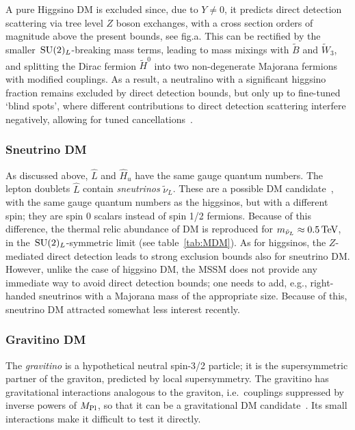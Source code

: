 A pure Higgsino DM \cite{Higgsino:DM} is excluded since, due to $Y \neq 0$, it predicts direct detection scattering via tree level $Z$ boson exchanges, 
with a  cross section orders of magnitude above the present bounds, see fig.a.
This can be rectified by the smaller $\,{\rm SU}(2)_L$-breaking mass terms, leading to mass mixings with $\tilde{B}$ and $\tilde{W}_3$,
and splitting the Dirac fermion $\tilde H^0$ into two non-degenerate Majorana fermions with modified couplings.
As a result, a neutralino with a significant higgsino fraction remains excluded 
by direct detection bounds, but only up to fine-tuned `blind spots',  where different contributions to direct detection scattering
interfere negatively, allowing for tuned cancellations~\cite{WellTempered}.


\subsubsection{Sneutrino DM}
As discussed above, $\hat L$ and $\hat H_u$ have the same gauge quantum numbers.
The lepton doublets $\hat L$ contain {\em sneutrinos} $\tilde{\nu}_L$. 
These are a possible DM candidate~\cite{Sneutrino:DM}, with the same gauge quantum numbers
as the higgsinos, but with a different spin; they are spin 0 scalars instead of spin 1/2 fermions. 
Because of this difference, the thermal relic abundance of DM is reproduced for
$ m_{\tilde{\nu}_L} \approx 0.5\,{\rm TeV}$, in the $\,{\rm SU}(2)_L$-symmetric limit (see table~\ref{tab:MDM}).
As for higgsinos, the $Z$-mediated direct detection leads to strong exclusion bounds also for sneutrino DM.
However, unlike the case of higgsino DM, the MSSM does not provide any immediate way to avoid direct detection bounds;
one needs to add, e.g., right-handed sneutrinos with a Majorana mass of the appropriate size.
Because of this, sneutrino DM attracted somewhat less interest recently.





\subsubsection{Gravitino DM}\label{sec:gravitinoDM}
The {\em gravitino} is a hypothetical neutral spin-3/2 particle; 
it is the supersymmetric partner of the graviton, predicted by local supersymmetry.
The gravitino has gravitational interactions analogous to the graviton, i.e.~couplings suppressed by inverse powers of $M_{\rm Pl}$, 
so that it can be a gravitational DM candidate~\cite{gravitinoDM}.
Its small interactions make it difficult to test it directly.

